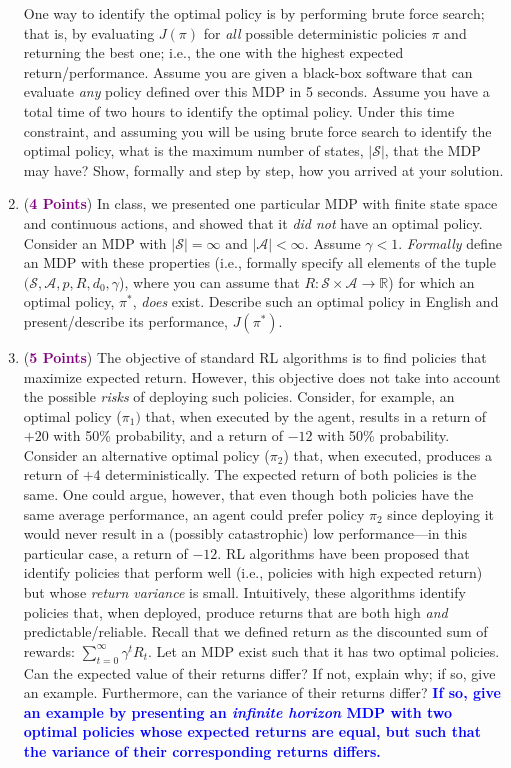 \documentclass{article}
\newcommand{\POINTS}[1]{\textcolor{purple}{\textbf{{#1}}}}
\begin{document}
\begin{enumerate}
    One way to identify the optimal policy is by performing brute force search; that is, by evaluating $J(\pi)$ for \textit{all} possible deterministic policies $\pi$ and returning the best one; i.e., the one with the highest expected return/performance.
    Assume you are given a black-box software that can evaluate \textit{any} policy defined over this MDP in 5 seconds. Assume you have a total time of two hours to identify the optimal policy.
    Under this time constraint, and assuming you will be using brute force search to identify the optimal policy, what is the maximum number of states, $|\mathcal S|$, that the MDP may have? Show, formally and step by step, how you arrived at your solution.
    \item (\POINTS{4 Points}) In class, we presented one particular MDP with finite state space and continuous actions, and showed that it \textit{did not} have an optimal policy. Consider an MDP with $|\mathcal S| = \infty$ and $|\mathcal A| < \infty$. Assume $\gamma < 1$. \textit{Formally} define an MDP with these properties (i.e., formally specify all elements of the tuple $(\mathcal{S}, \mathcal{A}, p, R, d_0, \gamma$), where you can assume that $R: \mathcal{S} \times \mathcal{A} \rightarrow \mathbb{R}$) for which an optimal policy, $\pi^*$, \textit{does} exist. Describe such an optimal policy in English and present/describe its performance, $J(\pi^*)$.
    \item (\POINTS{5 Points}) The objective of standard RL algorithms is to find policies that maximize expected return. However, this objective does not take into account the possible \textit{risks} of deploying such policies. Consider, for example, an optimal policy ($\pi_1)$ that, when executed by the agent, results in a return of $+20$ with 50\% probability, and a return of $-12$ with 50\% probability. Consider an alternative optimal policy ($\pi_2$) that, when executed, produces a return of $+4$  deterministically. The expected return of both policies is the same. One could argue, however, that even though both policies have the same average performance, an agent could prefer policy $\pi_2$ since deploying it would never result in a (possibly catastrophic) low performance---in this particular case, a return of $-12$. RL algorithms have been proposed that identify policies that perform well (i.e., policies with high expected return) but whose \textit{return variance} is small. Intuitively, these algorithms identify policies that, when deployed, produce returns that are both high \textit{and} predictable/reliable. Recall that we defined return as the discounted sum of rewards: $\sum_{t=0}^\infty \gamma^t R_t$. Let an MDP exist such that it has two optimal policies. Can the expected value of their returns differ? If not, explain why; if so, give an example. Furthermore, can the variance of their returns differ? \textcolor{blue}{\textbf{If so, give an example by presenting an \textit{infinite horizon} MDP with two optimal policies whose expected returns are equal, but such that the variance of their corresponding returns differs.}}

\end{enumerate}
\end{document}
